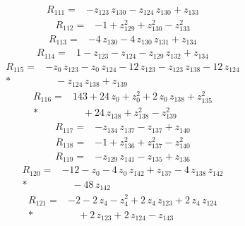\documentclass[10pt]{article}
\begin{document}
\begin{align*}
R_{111}={}& - z_{123}\,z_{130} - z_{124}\,z_{130} + z_{133}
\end{align*}
\begin{align*}
R_{112}={}& - 1 + z_{129}^{2} + z_{130}^{2} - z_{133}^{2}
\end{align*}
\begin{align*}
R_{113}={}& - 4\,z_{130} - 4\,z_{130}\,z_{131} + z_{134}
\end{align*}
\begin{align*}
R_{114}={}& 1 - z_{123} - z_{124} - z_{129}\,z_{132} + z_{134}
\end{align*}
\begin{align*}
R_{115}={}& - z_{0}\,z_{123} - z_{0}\,z_{124} - 12\,z_{123} - z_{123}\,z_{138} - 12\,z_{124} \\*
&\quad - z_{124}\,z_{138} + z_{139}
\end{align*}
\begin{align*}
R_{116}={}& 143 + 24\,z_{0} + z_{0}^{2} + 2\,z_{0}\,z_{138} + z_{135}^{2} \\*
&\quad + 24\,z_{138} + z_{138}^{2} - z_{139}^{2}
\end{align*}
\begin{align*}
R_{117}={}& - z_{134}\,z_{137} - z_{137} + z_{140}
\end{align*}
\begin{align*}
R_{118}={}& - 1 + z_{136}^{2} + z_{137}^{2} - z_{140}^{2}
\end{align*}
\begin{align*}
R_{119}={}& - z_{129}\,z_{141} - z_{135} + z_{136}
\end{align*}
\begin{align*}
R_{120}={}& - 12 - z_{0} - 4\,z_{0}\,z_{142} + z_{137} - 4\,z_{138}\,z_{142} \\*
&\quad - 48\,z_{142}
\end{align*}
\begin{align*}
R_{121}={}& - 2 - 2\,z_{4} - z_{4}^{2} + 2\,z_{4}\,z_{123} + 2\,z_{4}\,z_{124} \\*
&\quad + 2\,z_{123} + 2\,z_{124} - z_{143}
\end{align*}
\end{document}
